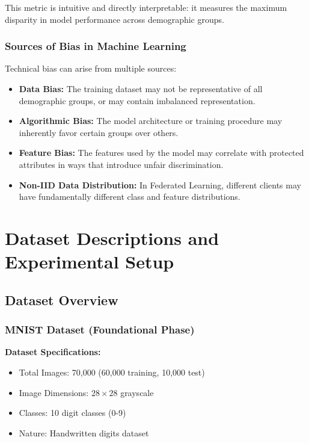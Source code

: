 \documentclass[11pt,a4paper]{report}
\begin{document}
This metric is intuitive and directly interpretable: it measures the maximum disparity in model performance across demographic groups.

\subsection{Sources of Bias in Machine Learning}

Technical bias can arise from multiple sources:

\begin{itemize}
    \item \textbf{Data Bias:} The training dataset may not be representative of all demographic groups, or may contain imbalanced representation.
    \item \textbf{Algorithmic Bias:} The model architecture or training procedure may inherently favor certain groups over others.
    \item \textbf{Feature Bias:} The features used by the model may correlate with protected attributes in ways that introduce unfair discrimination.
    \item \textbf{Non-IID Data Distribution:} In Federated Learning, different clients may have fundamentally different class and feature distributions.
\end{itemize}

\chapter{Dataset Descriptions and Experimental Setup}

\section{Dataset Overview}

\subsection{MNIST Dataset (Foundational Phase)}

\textbf{Dataset Specifications:}
\begin{itemize}
    \item Total Images: 70,000 (60,000 training, 10,000 test)
    \item Image Dimensions: $28 \times 28$ grayscale
    \item Classes: 10 digit classes (0-9)
    \item Nature: Handwritten digits dataset
\end{itemize}
\end{document}

